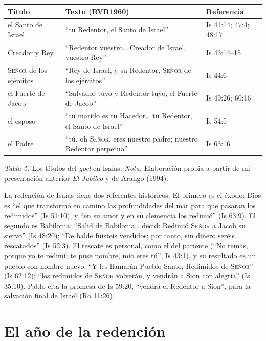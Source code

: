 \documentclass[11pt,letterpaper]{article}
\newcommand{\SENOR}{\textsc{Señor}}
\newcommand{\pie}[1]{\par{\footnotesize\color{sepia}#1\par}}
\begin{document}
\begin{center}\begin{minipage}{\linewidth}\centering\small\renewcommand{\arraystretch}{1.18}
\begin{tabular}{@{}L{5.2cm}L{6.4cm}L{3.0cm}@{}}
\toprule
\textbf{Título} & \textbf{Texto (RVR1960)} & \textbf{Referencia} \\ \midrule
el Santo de Israel & ``tu Redentor, el Santo de Israel'' & Is 41:14; 47:4; 48:17 \\
Creador y Rey & ``Redentor vuestro\ldots{} Creador de Israel, vuestro Rey'' & Is 43:14--15 \\
\SENOR{} de los ejércitos & ``Rey de Israel, y su Redentor, \SENOR{} de los ejércitos'' & Is 44:6 \\
el Fuerte de Jacob & ``Salvador tuyo y Redentor tuyo, el Fuerte de Jacob'' & Is 49:26; 60:16 \\
el esposo & ``tu marido es tu Hacedor\ldots{} tu Redentor, el Santo de Israel'' & Is 54:5 \\
el Padre & ``tú, oh \SENOR, eres nuestro padre; nuestro Redentor perpetuo'' & Is 63:16 \\
\bottomrule
\end{tabular}\par
\pie{\textit{Tabla 5.} Los títulos del \emph{goel} en Isaías. \textit{Nota.} Elaboración propia a partir de mi presentación anterior \emph{El Jubileo} y de Arango (1994).}
\end{minipage}\end{center}

La redención de Isaías tiene dos referentes históricos. El primero es el éxodo: Dios es ``el que transformó en camino las profundidades del mar para que pasaran los redimidos'' (Is 51:10), y ``en su amor y en su clemencia los redimió'' (Is 63:9). El segundo es Babilonia: ``Salid de Babilonia\ldots{} decid: Redimió \SENOR{} a Jacob su siervo'' (Is 48:20); ``De balde fuisteis vendidos; por tanto, sin dinero seréis rescatados'' (Is 52:3). El rescate es personal, como el del pariente (``No temas, porque yo te redimí; te puse nombre, mío eres tú'', Is 43:1), y su resultado es un pueblo con nombre nuevo: ``Y les llamarán Pueblo Santo, Redimidos de \SENOR'' (Is 62:12); ``los redimidos de \SENOR{} volverán, y vendrán a Sion con alegría'' (Is 35:10). Pablo cita la promesa de Is 59:20, ``vendrá el Redentor a Sion'', para la salvación final de Israel (Ro 11:26).

\section{El año de la redención}
\end{document}
